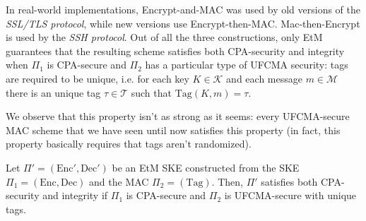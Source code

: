 \documentclass[a4paper, 12pt]{report}
\begin{document}
    In real-world implementations, Encrypt-and-MAC was used by old versions of the \textit{SSL/TLS protocol}, while new versions use Encrypt-then-MAC. Mac-then-Encrypt is used by the \textit{SSH protocol}. Out of all the three constructions, only EtM guarantees that the resulting scheme satisfies both CPA-security and integrity when $\Pi_1$ is CPA-secure and $\Pi_2$ has a particular type of UFCMA security: tags are required to be unique, i.e. for each key $K \in \mathcal{K}$ and each message $m \in \mathcal{M}$ there is an unique tag $\tau \in \mathcal{T}$ such that $\mathrm{Tag}(K, m) = \tau$.

    We observe that this property isn't as strong as it seems: every UFCMA-secure MAC scheme that we have seen until now satisfies this property (in fact, this property basically requires that tags aren't randomized).

    \begin{framedthm}{}
        Let $\Pi' = (\mathrm{Enc}', \mathrm{Dec}')$ be an EtM SKE constructed from the SKE $\Pi_1 = (\mathrm{Enc}, \mathrm{Dec})$ and the MAC $\Pi_2 = (\mathrm{Tag})$. Then, $\Pi'$ satisfies both CPA-security and integrity if $\Pi_1$ is CPA-secure and $\Pi_2$ is UFCMA-secure with unique tags.
    \end{framedthm}
\end{document}
